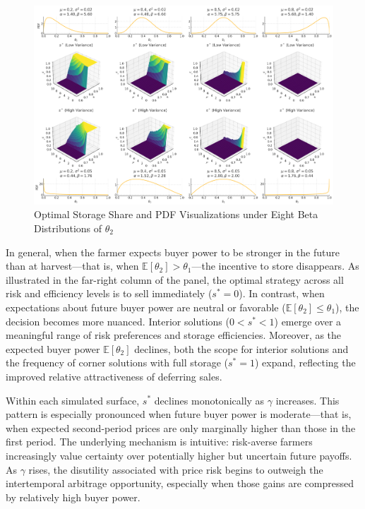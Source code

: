 \begin{figure}[pht]
\centering
\includegraphics[width=\textwidth]{model_figures/3D_formulation.png}
\caption{Optimal Storage Share and PDF Visualizations under Eight Beta Distributions of $\theta_2$}
\label{Figure:3D_formulation}
\end{figure}

In general, when the farmer expects buyer power to be stronger in the future than at harvest—that is, when $\mathbb{E}[\theta_2] > \theta_1$—the incentive to store disappears. As illustrated in the far-right column of the panel, the optimal strategy across all risk and efficiency levels is to sell immediately ($s^* = 0$). In contrast, when expectations about future buyer power are neutral or favorable ($\mathbb{E}[\theta_2] \leq \theta_1$), the decision becomes more nuanced. Interior solutions ($0 < s^* < 1$) emerge over a meaningful range of risk preferences and storage efficiencies. Moreover, as the expected buyer power $\mathbb{E}[\theta_2]$ declines, both the scope for interior solutions and the frequency of corner solutions with full storage ($s^* = 1$) expand, reflecting the improved relative attractiveness of deferring sales.



Within each simulated surface, $s^*$ declines monotonically as $\gamma$ increases. This pattern is especially pronounced when future buyer power is moderate—that is, when expected second-period prices are only marginally higher than those in the first period. The underlying mechanism is intuitive: risk-averse farmers increasingly value certainty over potentially higher but uncertain future payoffs. As $\gamma$ rises, the disutility associated with price risk begins to outweigh the intertemporal arbitrage opportunity, especially when those gains are compressed by relatively high buyer power.



